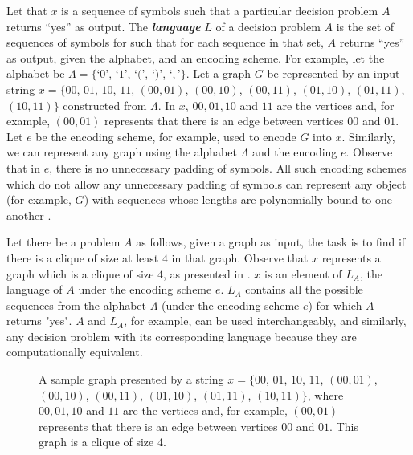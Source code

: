 Let that $x$ is a sequence of symbols such that a particular decision problem $A$ returns ``yes'' as output. The \textbf{\textit{language}} $L$ of a decision problem $A$ is the set of sequences of symbols for such that for each sequence in that set, $A$ returns ``yes'' as output, given the alphabet, and an encoding scheme. For example, let the alphabet be $\Lambda = \{$`$0$', `$1$', `$($', `$)$', `$,$'$\}$. Let a graph $G$ be represented by an input string $x=\{00$, $01$, $10$, $11$, $(00,01)$, $(00,10)$, $(00,11)$, $(01,10)$, $(01,11)$, $(10,11)\}$ constructed from $\Lambda$. In $x$, $00,01,10$ and $11$ are the vertices and, for example, $(00,01)$ represents that there is an edge between vertices $00$ and $01$. Let $e$ be the encoding scheme, for example, used to encode $G$ into $x$. Similarly, we can represent any graph using the alphabet $\Lambda$ and the encoding $e$. Observe that in $e$, there is no unnecessary padding of symbols. All such encoding schemes which do not allow any unnecessary padding of symbols can represent any object (for example, $G$) with sequences whose lengths are polynomially bound to one another \cite{Garey1979}.

Let there be a problem $A$ as follows, given a graph as input, the task is to find if there is a clique of size at least $4$ in that graph. Observe that $x$ represents a graph which is a clique of size $4$, as presented in . $x$ is an element of $L_A$, the language of $A$ under the encoding scheme $e$. $L_A$ contains all the possible sequences from the alphabet $\Lambda$ (under the encoding scheme $e$) for which $A$ returns "yes". $A$ and $L_A$, for example, can be used interchangeably, and similarly, any decision problem with its corresponding language because they are computationally equivalent.

\begin{figure}
    \begin{minipage}{1\textwidth}
        \centering
    \end{minipage}
    \caption{A sample graph presented by a string $x=\{00$, $01$, $10$, $11$, $(00,01)$, $(00,10)$, $(00,11)$, $(01,10)$, $(01,11)$, $(10,11)\}$, where $00,01,10$ and $11$ are the vertices and, for example, $(00,01)$ represents that there is an edge between vertices $00$ and $01$. This graph is a clique of size 4.}
    \label{figure:clique4}
\end{figure}

